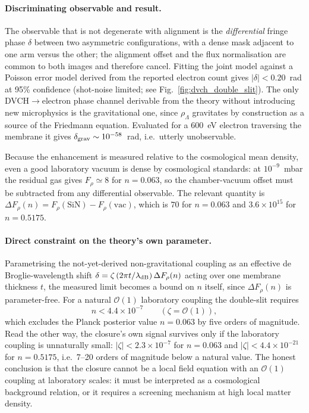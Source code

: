 \documentclass[pdflatex,sn-mathphys-num]{sn-jnl}%
\begin{document}
\paragraph{Discriminating observable and result.}
The observable that is not degenerate with alignment is the \emph{differential}
fringe phase $\delta$ between two asymmetric configurations, with a dense mask
adjacent to one arm versus the other; the alignment offset and the flux
normalisation are common to both images and therefore cancel. Fitting the joint
model against a Poisson error model derived from the reported electron count
gives $|\delta|<0.20$~rad at 95\% confidence (shot-noise limited; see
Fig.~\ref{fig:dvch_double_slit}). The only DVCH$\to$electron phase channel
derivable from the theory without introducing new microphysics is the
gravitational one, since $\rho_\Lambda$ gravitates by construction as a source
of the Friedmann equation. Evaluated for a 600~eV electron traversing the
membrane it gives $\delta_{\rm grav}\sim10^{-58}$~rad, i.e.\ utterly
unobservable.

Because the enhancement is measured relative to the cosmological mean density,
even a good laboratory vacuum is dense by cosmological standards: at
$10^{-9}$~mbar the residual gas gives $F_\rho\simeq8$ for $n=0.063$, so the
chamber-vacuum offset must be subtracted from any differential observable. The
relevant quantity is $\Delta F_\rho(n)=F_\rho(\mathrm{SiN})-F_\rho(\mathrm{vac})$,
which is $70$ for $n=0.063$ and $3.6\times10^{15}$ for $n=0.5175$.

\paragraph{Direct constraint on the theory's own parameter.}
Parametrising the not-yet-derived non-gravitational coupling as an effective de
Broglie-wavelength shift
$\delta=\zeta\,(2\pi t/\lambda_{\rm dB})\,\Delta F_\rho(n)$ acting over one
membrane thickness $t$, the measured limit becomes a bound on $n$ itself, since
$\Delta F_\rho(n)$ is parameter-free. For a natural $\mathcal{O}(1)$ laboratory
coupling the double-slit requires
\begin{equation}
n<4.4\times10^{-7}\qquad(\zeta=\mathcal{O}(1)),
\end{equation}
which excludes the Planck posterior value $n=0.063$ by five orders of magnitude.
Read the other way, the closure's own signal survives only if the laboratory
coupling is unnaturally small:
$|\zeta|<2.3\times10^{-7}$ for $n=0.063$ and $|\zeta|<4.4\times10^{-21}$ for
$n=0.5175$, i.e.\ 7--20 orders of magnitude below a natural value. The honest
conclusion is that the closure cannot be a local field equation with an
$\mathcal{O}(1)$ coupling at laboratory scales: it must be interpreted as a
cosmological background relation, or it requires a screening mechanism at high
local matter density.
\end{document}
